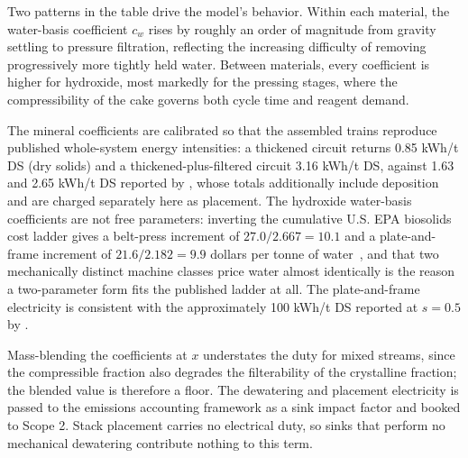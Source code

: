 \documentclass{article}
\renewcommand\_{\textunderscore\allowbreak}
\begin{document}
Two patterns in the table drive the model's behavior. Within each material, the water-basis coefficient $c_w$ rises by roughly an order of magnitude from gravity settling to pressure filtration, reflecting the increasing difficulty of removing progressively more tightly held water. Between materials, every coefficient is higher for hydroxide, most markedly for the pressing stages, where the compressibility of the cake governs both cycle time and reagent demand.

The mineral coefficients are calibrated so that the assembled trains reproduce published whole-system energy intensities: a thickened circuit returns 0.85 kWh/t DS (dry solids) and a thickened-plus-filtered circuit 3.16 kWh/t DS, against 1.63 and 2.65 kWh/t DS reported by \citet{carneiroConceptualCostComparison2018}, whose totals additionally include deposition and are charged separately here as placement. The hydroxide water-basis coefficients are not free parameters: inverting the cumulative U.S. EPA biosolids cost ladder gives a belt-press increment of $27.0/2.667 = 10.1$ and a plate-and-frame increment of $21.6/2.182 = 9.9$ dollars per tonne of water~\citep{usepaBiosolidsTechnologyFact2000, usepaBiosolidsTechSheetPlatePress2000}, and that two mechanically distinct machine classes price water almost identically is the reason a two-parameter form fits the published ladder at all. The plate-and-frame electricity is consistent with the approximately 100 kWh/t DS reported at $s = 0.5$ by \citet{smithEnergyConventionalWater2017}.

Mass-blending the coefficients at $x$ understates the duty for mixed streams, since the compressible fraction also degrades the filterability of the crystalline fraction; the blended value is therefore a floor. The dewatering and placement electricity is passed to the emissions accounting framework as a sink impact factor and booked to Scope 2. Stack placement carries no electrical duty, so sinks that perform no mechanical dewatering contribute nothing to this term.
\end{document}
